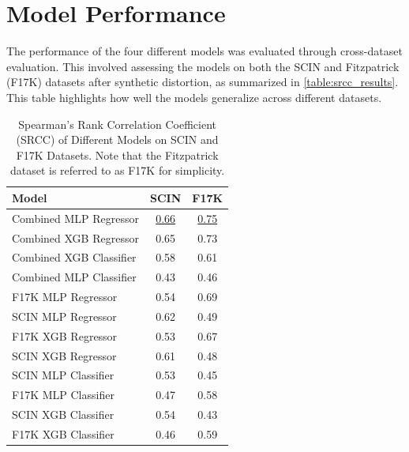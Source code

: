 \section{Model Performance}
\label{sec:ModelPerformance}
The performance of the four different models was evaluated through cross-dataset evaluation. This involved assessing the models on both the SCIN and Fitzpatrick (F17K) datasets after synthetic distortion, as summarized in \autoref{table:srcc_results}. This table highlights how well the models generalize across different datasets.\par 
 \begin{table}[ht]
    \centering
    \begin{tabular}{|l|c|c|}
        \hline
        \textbf{Model} & \textbf{SCIN} & \textbf{F17K} \\
        \hline
        Combined MLP Regressor & \underline{0.66} & \underline{0.75} \\
        Combined XGB Regressor & 0.65 & 0.73 \\
        Combined XGB Classifier & 0.58 & 0.61 \\
        Combined MLP Classifier & 0.43 & 0.46 \\
        \hline
        F17K MLP Regressor & 0.54 & 0.69 \\
        SCIN MLP Regressor & 0.62 & 0.49 \\
        F17K XGB Regressor & 0.53 & 0.67 \\
        SCIN XGB Regressor & 0.61 & 0.48 \\
        SCIN MLP Classifier & 0.53 & 0.45 \\
        F17K MLP Classifier & 0.47 & 0.58 \\
        SCIN XGB Classifier & 0.54 & 0.43 \\
        F17K XGB Classifier & 0.46 & 0.59 \\
        \hline
    \end{tabular}
    \caption{Spearman’s Rank Correlation Coefficient (SRCC) of Different Models on SCIN and F17K Datasets. Note that the Fitzpatrick dataset is referred to as F17K for simplicity.}
    \label{table:srcc_results}
\end{table}

